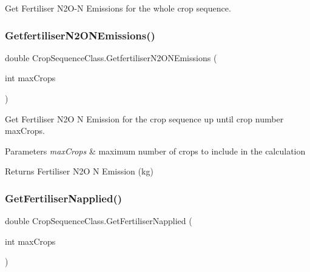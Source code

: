 Get Fertiliser N2\+O-\/N Emissions for the whole crop sequence. 

\mbox{\label{class_crop_sequence_class_a25ec8b736a7caa75da1edcac08360cd7}} 
\subsubsection{\texorpdfstring{GetfertiliserN2ONEmissions()}{GetfertiliserN2ONEmissions()}\hspace{0.1cm}{\footnotesize\ttfamily [2/2]}}
{\footnotesize\ttfamily double Crop\+Sequence\+Class.\+Getfertiliser\+N2\+O\+N\+Emissions (\begin{DoxyParamCaption}\item[{int}]{max\+Crops }\end{DoxyParamCaption})\hspace{0.3cm}{\ttfamily [inline]}}



Get Fertiliser N2O N Emission for the crop sequence up until crop number max\+Crops. 


\begin{DoxyParams}{Parameters}
{\em max\+Crops} & maximum number of crops to include in the calculation \\
\hline
\end{DoxyParams}
\begin{DoxyReturn}{Returns}
Fertiliser N2O N Emission (kg) 
\end{DoxyReturn}
\mbox{\label{class_crop_sequence_class_addf101545276712d2d93c28e298d36ae}} 
\subsubsection{\texorpdfstring{GetFertiliserNapplied()}{GetFertiliserNapplied()}}
{\footnotesize\ttfamily double Crop\+Sequence\+Class.\+Get\+Fertiliser\+Napplied (\begin{DoxyParamCaption}\item[{int}]{max\+Crops }\end{DoxyParamCaption})\hspace{0.3cm}{\ttfamily [inline]}}



